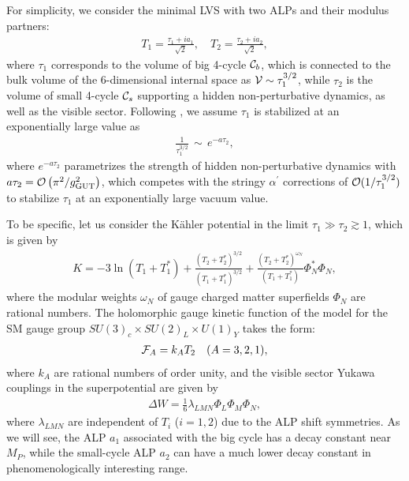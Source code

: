 \documentclass[preprint,prd,aps,tighten,nofootinbib,amssymb]{revtex4}
\newcommand{\bea}{\begin{eqnarray}}
\newcommand{\eea}{\end{eqnarray}}
\begin{document}
For simplicity, we consider the minimal LVS with two ALPs and their modulus partners:
\bea T_1=\frac{\tau_1+ia_1}{\sqrt{2}}, \quad T_2=\frac{\tau_2+ia_2}{\sqrt{2}},\eea where
$\tau_1$ corresponds to the volume of big 4-cycle ${\cal C}_b$, which is connected to the bulk volume of the 6-dimensional internal space as
${\cal V}\sim \tau_1^{3/2}$, while $\tau_2$ is the volume of small 4-cycle ${\cal C}_s$ supporting a hidden non-perturbative dynamics, as well as the visible sector.
Following \cite{Balasubramanian:2005zx}, we assume $\tau_1$ is stabilized at an exponentially large value as
\bea
\label{lvs}
\frac{1}{\tau_1^{3/2}}\,\sim \, e^{-a\tau_2} , 
\eea
where $e^{-a\tau_2}$ parametrizes the strength of hidden non-perturbative dynamics with $a\tau_2 ={\cal O}\left({\pi^2}/{g_{\rm GUT}^2}\right)$, 
which competes with the stringy $\alpha^\prime$ corrections of ${\cal O}(1/\tau_1^{3/2})$ to stabilize $\tau_1$ at an  exponentially large vacuum value.

To be specific, let us consider the K\"ahler potential in the limit $\tau_1\gg \tau_2\gtrsim 1$, which is given by \cite{Balasubramanian:2005zx}
\bea
\label{kahler}
K=-3\ln(T_1+T_1^*) +\frac{(T_2+T_2^*)^{3/2}}{(T_1+T_1^*)^{3/2}} +\frac{(T_2+T_2^*)^{\omega_N}}{(T_1+T_1^*)}\Phi_N^*\Phi_N,
\eea 
where the modular weights $\omega_N$ of gauge charged matter superfields $\Phi_N$ are rational numbers. 
The holomorphic gauge kinetic function of the model for the SM gauge group $SU(3)_c\times SU(2)_L\times U(1)_Y$  takes the form:
\bea
\label{holomorphic_gauge}
{\cal F}_A = k_A T_2 \quad (A=3,2,1),\eea
where $k_A$ are rational numbers of order unity, and
the visible sector Yukawa couplings in the superpotential are given by
\bea
\label{homolorphic_yukawa}
\Delta W =\frac{1}{6}\lambda_{LMN}\Phi_L\Phi_M\Phi_N,\eea
where  $\lambda_{LMN}$ are independent of $T_i$ ($i=1,2$) due to the ALP shift symmetries. 
As we will see, the ALP $a_1$ associated with the big cycle has a decay constant near  $M_P$, while the small-cycle ALP $a_2$ can have a much lower decay constant in phenomenologically interesting range. 
\end{document}
